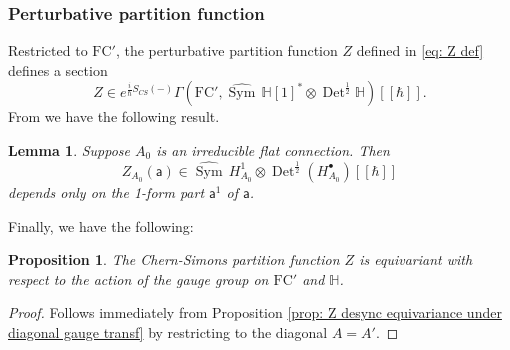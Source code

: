 \documentclass[11pt,a4paper]{amsart}
\theoremstyle{plain} %
\newtheorem{lem}[thm]{Lemma}
\newtheorem{prop}[thm]{Proposition}
\theoremstyle{definition}
\theoremstyle{remark}
\newcommand{\g}{\mathfrak{g}}
\newcommand{\Det}{\operatorname{Det}}
\newcommand{\Sym}{\operatorname{Sym}}
\newcommand{\mr}{\mathrm}
\newcommand{\sfa}{\mathsf{a}}
\newcommand{\M}{\mathcal{M}}
\newcommand{\wh}{\widehat}
\newcommand{\FC}{\mathrm{FC}}
\begin{document}
{    \subsubsection{Perturbative partition function}
    Restricted to  $\FC'$, the perturbative partition function  $Z$ defined in \eqref{eq: Z def} defines a section 
\begin{equation}\label{eq: Z pert section}
    Z \in e^{\frac{i}{\hbar}S_{CS}(-)} \Gamma(\FC', \wh{\Sym}\,\mathbb{H}[1]^* \otimes \Det^\frac12 \mathbb{H} 
    )[[\hbar]].
\end{equation}
From \cite{Cattaneo2008} we have the following result. 
\begin{lem}\label{lem: 1 form part}
Suppose $A_0$ is an irreducible flat connection. Then 
$$Z_{A_0}(\sfa) \in \wh{\Sym}\,H^1_{A_0} \otimes \Det^\frac12(H^\bullet_{A_0})[[\hbar]]$$ %
depends only on the 1-form part $\sfa^{1}$ of $\sfa$.  
\end{lem} 
Finally, we have the following:
\begin{prop}\label{prop: equivariance}
The Chern-Simons partition function $Z$ is equivariant with respect to the  action of the gauge group on $\FC'$ and $\mathbb{H}$.
\end{prop}
\begin{proof}
Follows immediately from Proposition \ref{prop: Z desync equivariance under diagonal gauge transf} by restricting to the diagonal $A=A'$.
\end{proof}

}
\end{document}
